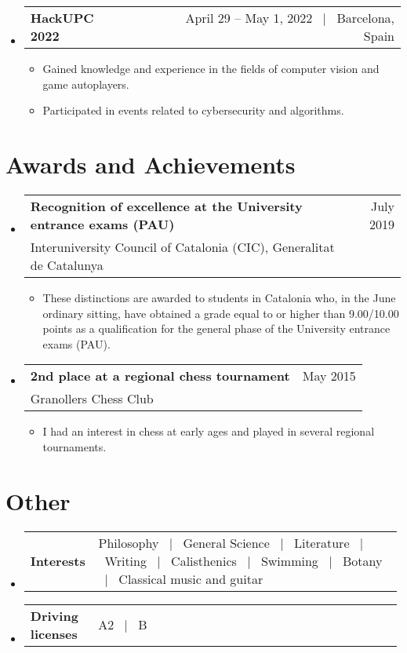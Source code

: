\documentclass[a4paper,11pt]{article}
\makeatletter
\newcommand{\resumeSectionTypeOne}[2]{
  \item\begin{tabular*}{0.99\textwidth}[t]{
    p{0.18\linewidth}p{0.81\linewidth}
  }
  \textbf{#1} & #2
  \end{tabular*}\vspace{-2pt}
}
\newcommand{\resumeTrioHeading}[3]{
  \item
    \begin{tabular*}{0.96\textwidth}[t]{
      l@{\extracolsep{\fill}}c@{\extracolsep{\fill}}r
    }
      \textbf{#1} & \small \textit{#2} & \small #3
    \end{tabular*}
}
\newcommand{\resumeQuadHeading}[4]{
  \item
  \begin{tabular*}{0.96\textwidth}[t]{l@{\extracolsep{\fill}}r}
    \textbf{#1} & \small #2 \\
    \small#3 & \small #4 \\
  \end{tabular*}
}
\newcommand{\resumeHeadingListStart}{
  \begin{itemize}[leftmargin=0.15in, label={}]
}
\newcommand{\resumeHeadingListEnd}{\end{itemize}}
\makeatother
\begin{document}
  \resumeHeadingListStart{}
    \resumeTrioHeading{HackUPC 2022}{}{April 29 – May 1, 2022 \ $|$ \ Barcelona, Spain}
    \begin{itemize}[leftmargin=3em, itemsep=0.1em, topsep=2pt]
      \item \small Gained knowledge and experience in the fields of computer vision and game autoplayers.
      \item \small Participated in events related to cybersecurity and algorithms.
    \end{itemize}
  \resumeHeadingListEnd{}
  

\section{Awards and Achievements}
  \resumeHeadingListStart{}
    \resumeQuadHeading{Recognition of excellence at the University entrance exams (PAU)}{July 2019}{Interuniversity Council of Catalonia (CIC), Generalitat de Catalunya}{\ }
    \begin{itemize}[leftmargin=3em, itemsep=0.1em, topsep=2pt]
      \item \small These distinctions are awarded to students in Catalonia who, in the June ordinary sitting, have obtained a grade equal to or higher than 9.00/10.00 points as a qualification for the general phase of the University entrance exams (PAU).
    \end{itemize}
  \resumeHeadingListEnd{}

  \resumeHeadingListStart{}
    \resumeQuadHeading{2nd place at a regional chess tournament}{May 2015}{Granollers Chess Club}{\ }
    \begin{itemize}[leftmargin=3em, itemsep=0.1em, topsep=2pt]
      \item \small I had an interest in chess at early ages and played in several regional tournaments.
    \end{itemize}
  \resumeHeadingListEnd{}

\section{Other}
  \resumeHeadingListStart{}
    \resumeSectionTypeOne{Interests}{Philosophy \ $|$ \ General Science \ $|$ \ Literature \ $|$ \ Writing \ $|$ \ Calisthenics \ $|$ \ Swimming \ $|$ \ Botany \ $|$ \ Classical music and guitar}
  \resumeHeadingListEnd{}

  \resumeHeadingListStart{}
    \resumeSectionTypeOne{Driving licenses}{A2 \ $|$ \ B}
  \resumeHeadingListEnd{}
\end{document}
